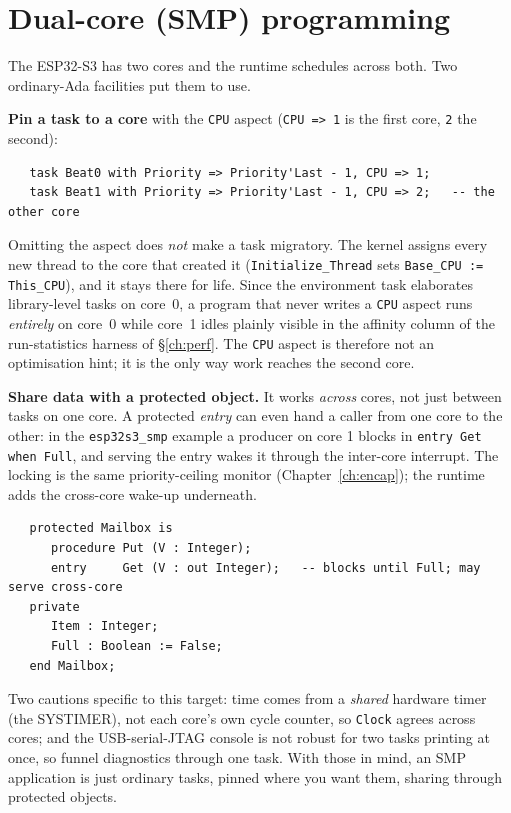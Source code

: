 \section{Dual-core (SMP) programming}
\label{sec:smp}

The ESP32-S3 has two cores and the runtime schedules across both. Two ordinary-Ada
facilities put them to use.

\textbf{Pin a task to a core} with the \texttt{CPU} aspect (\texttt{CPU => 1} is
the first core, \texttt{2} the second):

\begin{lstlisting}
   task Beat0 with Priority => Priority'Last - 1, CPU => 1;
   task Beat1 with Priority => Priority'Last - 1, CPU => 2;   -- the other core
\end{lstlisting}

Omitting the aspect does \emph{not} make a task migratory.  The kernel assigns
every new thread to the core that created it
(\texttt{Initialize\_Thread} sets \texttt{Base\_CPU := This\_CPU}), and it
stays there for life.  Since the environment task elaborates library-level
tasks on core~0, a program that never writes a \texttt{CPU} aspect runs
\emph{entirely} on core~0 while core~1 idles \textemdash{} plainly visible in
the affinity column of the run-statistics harness of \S\ref{ch:perf}.  The \texttt{CPU} aspect is therefore not an optimisation
hint; it is the only way work reaches the second core.

\textbf{Share data with a protected object.} It works \emph{across} cores, not
just between tasks on one core. A protected \emph{entry} can even hand a caller
from one core to the other: in the \texttt{esp32s3\_smp} example a producer on
core 1 blocks in \texttt{entry Get when Full}, and serving the entry wakes it
through the inter-core interrupt. The locking is the same priority-ceiling monitor
(Chapter~\ref{ch:encap}); the runtime adds the cross-core wake-up underneath.

\begin{lstlisting}
   protected Mailbox is
      procedure Put (V : Integer);
      entry     Get (V : out Integer);   -- blocks until Full; may serve cross-core
   private
      Item : Integer;
      Full : Boolean := False;
   end Mailbox;
\end{lstlisting}

Two cautions specific to this target: time comes from a \emph{shared} hardware
timer (the SYSTIMER), not each core's own cycle counter, so \texttt{Clock} agrees
across cores; and the USB-serial-JTAG console is not robust for two tasks printing
at once, so funnel diagnostics through one task. With those in mind, an SMP
application is just ordinary tasks, pinned where you want them, sharing through
protected objects.

